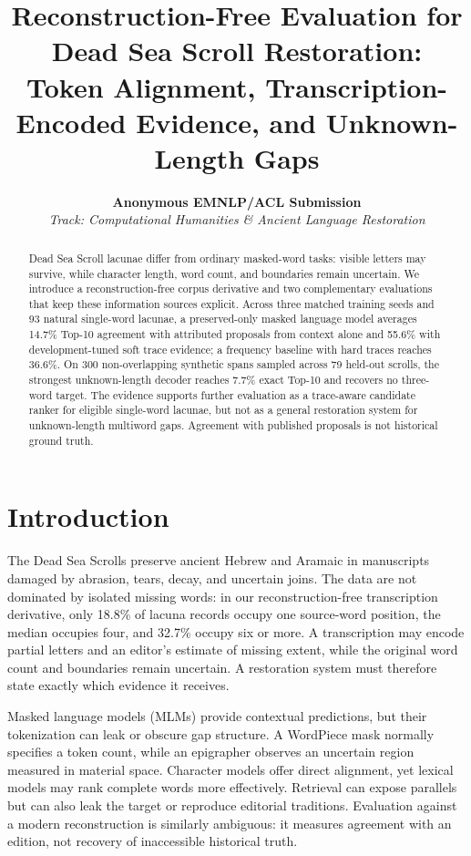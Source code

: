 \documentclass[10pt,twocolumn,a4paper]{article}
\title{\bfseries Reconstruction-Free Evaluation for Dead Sea Scroll Restoration:\\
Token Alignment, Transcription-Encoded Evidence, and Unknown-Length Gaps}
\author{\textbf{Anonymous EMNLP/ACL Submission} \\
\textit{Track: Computational Humanities \& Ancient Language Restoration}}
\date{}
\begin{document}
\maketitle

\begin{abstract}
\normalsize
Dead Sea Scroll lacunae differ from ordinary masked-word tasks: visible letters may survive, while character length, word count, and boundaries remain uncertain. We introduce a reconstruction-free corpus derivative and two complementary evaluations that keep these information sources explicit. Across three matched training seeds and 93 natural single-word lacunae, a preserved-only masked language model averages 14.7\% Top-10 agreement with attributed proposals from context alone and 55.6\% with development-tuned soft trace evidence; a frequency baseline with hard traces reaches 36.6\%. On 300 non-overlapping synthetic spans sampled across 79 held-out scrolls, the strongest unknown-length decoder reaches 7.7\% exact Top-10 and recovers no three-word target. The evidence supports further evaluation as a trace-aware candidate ranker for eligible single-word lacunae, but not as a general restoration system for unknown-length multiword gaps. Agreement with published proposals is not historical ground truth.
\end{abstract}

\section{Introduction}

The Dead Sea Scrolls preserve ancient Hebrew and Aramaic in manuscripts damaged by abrasion, tears, decay, and uncertain joins. The data are not dominated by isolated missing words: in our reconstruction-free transcription derivative, only 18.8\% of lacuna records occupy one source-word position, the median occupies four, and 32.7\% occupy six or more. A transcription may encode partial letters and an editor's estimate of missing extent, while the original word count and boundaries remain uncertain. A restoration system must therefore state exactly which evidence it receives.

Masked language models (MLMs) provide contextual predictions, but their tokenization can leak or obscure gap structure. A WordPiece mask normally specifies a token count, while an epigrapher observes an uncertain region measured in material space. Character models offer direct alignment, yet lexical models may rank complete words more effectively. Retrieval can expose parallels but can also leak the target or reproduce editorial traditions. Evaluation against a modern reconstruction is similarly ambiguous: it measures agreement with an edition, not recovery of inaccessible historical truth.
\end{document}
